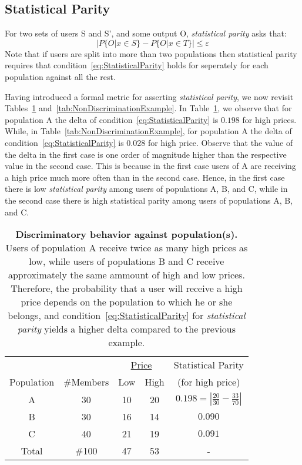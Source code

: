 \subsection{Statistical Parity}
\label{sect:statparity}

For two sets of users S and S', and some output O, {\em statistical parity}
asks that:
\begin{equation}
|P\{O | x \in S\} - P\{O | x \in T\}| \le \varepsilon
\label{eq:StatisticalParity}
\end{equation}
Note that if users are split into more than two populations then statistical
parity requires that condition~\ref{eq:StatisticalParity} holds for seperately
for each population against all the rest.

Having introduced a formal metric for asserting {\em statistical parity}, we now
revisit Tables~\ref{tab:DiscriminationExample}
and~\ref{tab:NonDiscriminationExample}.
In Table~\ref{tab:DiscriminationExample}, we observe that for population A the
delta of condition~\ref{eq:StatisticalParity} is $0.198$ for high prices.
While, in Table~\ref{tab:NonDiscriminationExample}, for population A the delta
of condition~\ref{eq:StatisticalParity} is $0.028$ for high price. Observe that
the value of the delta in the first case is one order of magnitude higher than
the respective value in the second case. This is because in the first case
users of A are receiving a high price much more often than in the second case.
Hence, in the first case there is low {\em statistical parity} among users of
populations A, B, and C, while in the second case there is high statistical
parity among users of populations A, B, and C.

\begin{table}[t]
{
 \scriptsize
  \renewcommand{\arraystretch}{1.5}
  \begin{tabular}{ c | c | c  c | c }
    & & \multicolumn{2}{|c|}{\underline{Price}} &  Statistical Parity\\
    Population & \#Members & Low & High & (for high price) \\
    \hline
    A & 30 &  10 & 20 & $0.198 = | \frac{20}{30} - \frac{33}{70}|$ \\
    B & 30 &  16 & 14 & $0.090$ \\
    C & 40 &  21 & 19 & $0.091$ \\
    \hline
    Total & \#100 & 47 & 53 & - \\
  \end{tabular}
  \caption{{\bf Discriminatory behavior against population(s).} Users of
    population A receive twice as many high prices as low, while users of
    populations B and C receive approximately the same ammount of high and low
    prices. Therefore, the probability that a user will receive a high price
    depends on the population to which he or she belongs, and
    condition~\ref{eq:StatisticalParity} for {\em statistical parity} yields a
    higher delta compared to the previous example.
  }
  \label{tab:DiscriminationExample}
}
\end{table}


